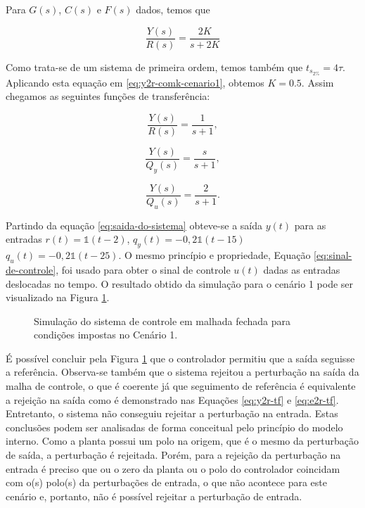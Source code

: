 Para $G(s)$, $C(s)$ e $F(s)$ dados, temos que

\begin{equation}
    \label{eq:y2r-comk-cenario1}
    \frac{Y(s)}{R(s)} = \frac{2K}{s + 2K}
\end{equation}

Como trata-se de um sistema de primeira ordem, temos também que $t_{s_{2\%}} =
4\tau$. Aplicando esta equação em \ref{eq:y2r-comk-cenario1}, obtemos $K = 0.5$.
Assim chegamos as seguintes funções de transferência:

\begin{equation}
    \label{eq:y2r-cenario1}
    \frac{Y(s)}{R(s)} = \frac{1}{s + 1},
\end{equation}

\begin{equation}
    \label{eq:y2qy-cenario1}
    \frac{Y(s)}{Q_{y}(s)} = \frac{s}{s + 1},
\end{equation}

\begin{equation}
    \label{eq:y2qu-cenario1}
    \frac{Y(s)}{Q_{u}(s)} = \frac{2}{s + 1}.
\end{equation}

Partindo da equação \ref{eq:saida-do-sistema} obteve-se a saída $y(t)$ para as
entradas $r(t) = \mathds{1}(t - 2)$, $q_{y}(t) = -0,2\mathds{1}(t - 15)$
$q_{u}(t) = -0,2\mathds{1}(t - 25)$. O mesmo princípio e propriedade, Equação
\ref{eq:sinal-de-controle}, foi usado para obter o sinal de controle $u(t)$
dadas as entradas deslocadas no tempo. O resultado obtido da simulação para o
cenário 1 pode ser visualizado na Figura \ref{fig:resultado-cenario1}.

\begin{figure}[!ht]
    \caption{Simulação do sistema de controle em malhada fechada para condições
    impostas no Cenário 1.}
    \vspace{-10pt}
    \hspace{-30pt}
    \label{fig:resultado-cenario1}
    \begin{minipage}{\linewidth}
        
    \end{minipage}
\end{figure}

É possível concluir pela Figura \ref{fig:resultado-cenario1} que o
controlador permitiu que a saída seguisse a referência. Observa-se também que o
sistema rejeitou a perturbação na saída da malha de controle, o que é coerente
já que seguimento de referência é equivalente a rejeição na saída como é
demonstrado nas Equações \ref{eq:y2r-tf} e \ref{eq:e2r-tf}. Entretanto, o
sistema não conseguiu rejeitar a perturbação na entrada. Estas conclusões
podem ser analisadas de forma conceitual pelo princípio do modelo interno. Como
a planta possui um polo na origem, que é o mesmo da perturbação de saída, a
perturbação é rejeitada. Porém, para a rejeição da perturbação na entrada é
preciso que ou o zero da planta ou o polo do controlador coincidam com o(s)
polo(s) da perturbações de entrada, o que não acontece para este cenário e,
portanto, não é possível rejeitar a perturbação de entrada.

